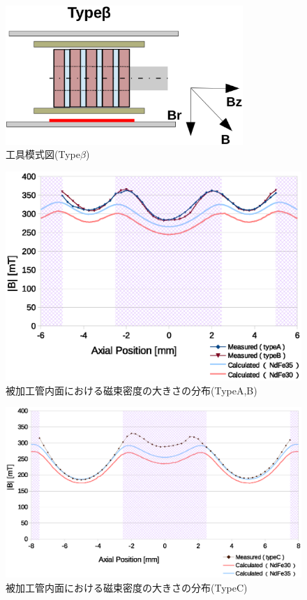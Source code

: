 \documentclass[11pt]{jarticle}
\begin{document}
  \begin{figure}[H]
    \begin{center}
      \includegraphics[width=90mm]{Typebeta_sd.eps}
    \end{center}
    \caption{工具模式図(Type$\beta$)}
    \label{fig:Typebeta_sd}
  \end{figure}

  \begin{figure}[H]
    \begin{center}
      \includegraphics[width=130mm]{TypeAB_B.eps}
    \end{center}
    \caption{被加工管内面における磁束密度の大きさの分布(TypeA,B)}
    \label{fig:TypeAB_B}
  \end{figure}

  \begin{figure}[H]
    \begin{center}
      \includegraphics[width=150mm]{TypeC_B.eps}
    \end{center}
    \caption{被加工管内面における磁束密度の大きさの分布(TypeC)}
    \label{fig:TypeC_B}
  \end{figure}
\end{document}

